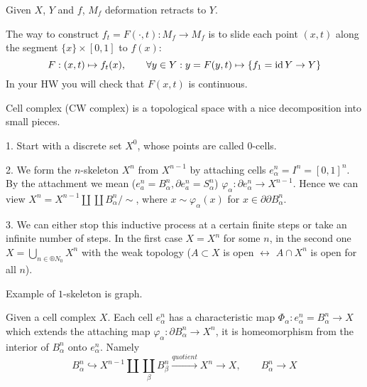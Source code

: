 \documentclass[12pt]{article}					%
\begin{document}
\begin{tvrzeni}
	Given $X$, $Y$ and $f$, $M_f$ deformation retracts to $Y$.

	\begin{dukazin}
		The way to construct $f_t = F(·, t): M_f \rightarrow M_f$ is to slide each point $(x, t)$ along the segment $\{x\}\times[0, 1]$ to $f(x)$:
		$$ F: (x, t) \mapsto f_t(x), \qquad \forall y \in Y: y = F(y, t) \mapsto \{f_1 = \operatorname{id} Y \rightarrow Y\} $$
		In your HW you will check that $F(x, t)$ is continuous.
	\end{dukazin}
\end{tvrzeni}

\begin{definice}
	\begin{poznamkain}
		Cell complex (CW complex) is a topological space with a nice decomposition into small pieces.
	\end{poznamkain}

	1. Start with a discrete set $X^0$, whose points are called $0$-cells.

	2. We form the $n$-skeleton $X^n$ from $X^{n - 1}$ by attaching cells $e_α^n = I^n = [0, 1]^n$. By the attachment we mean ($e_a^n = B_α^n, \partial e_a^n = S_α^n$) $φ_α: \partial e_α^n \rightarrow X^{n-1}$. Hence we can view $X^n = X^{n-1} \coprod \coprod B_α^n / \sim$, where $x \sim φ_α(x)$ for $x \in \partial \partial B_α^n$.

	3. We can either stop this inductive process at a certain finite steps or take an infinite number of steps. In the first case $X = X^n$ for some $n$, in the second one $X = \bigcup_{n \in ®N_0} X^n$ with the weak topology ($A \subset X$ is open $\leftrightarrow$ $A \cap X^n$ is open for all $n$).

	\begin{prikladyin}
		Example of $1$-skeleton is graph.
	\end{prikladyin}
\end{definice}

\begin{definice}
	Given a cell complex $X$. Each cell $e_α^n$ has a characteristic map $Φ_α: e_α^n = B_α^n \rightarrow X$ which extends the attaching map $φ_α: \partial B_α^n \rightarrow X^n$, it is homeomorphism from the interior of $B_α^n$ onto $e_α^n$. Namely
	$$ B_α^n \hookrightarrow X^{n-1} \coprod \coprod_β B_β^n \overset{quotient}\rightarrow X^n \rightarrow X, \qquad B_α^n \rightarrow X $$
\end{definice}
\end{document}
